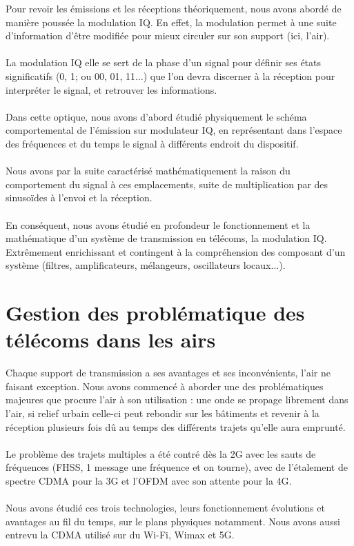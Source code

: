 Pour revoir les émissions et les réceptions théoriquement, nous avons abordé de manière poussée la modulation IQ. En effet, la modulation permet à une suite d'information d'être modifiée pour mieux circuler sur son support (ici, l'air).
\\ \\
La modulation IQ elle se sert de la phase d'un signal pour définir ses états significatifs (0, 1; ou 00, 01, 11...) que l'on devra discerner à la réception pour interpréter le signal, et retrouver les informations.
\\ \\
Dans cette optique, nous avons d'abord étudié physiquement le schéma comportemental de l'émission sur modulateur IQ, en représentant dans l'espace des fréquences et du temps le signal à différents endroit du dispositif.
\\ \\
Nous avons par la suite caractérisé mathématiquement la raison du comportement du signal à ces emplacements, suite de multiplication par des sinusoïdes à l'envoi et la réception.
\\ \\
En conséquent, nous avons étudié en profondeur le fonctionnement et la mathématique d'un système de transmission en télécoms, la modulation IQ. Extrêmement enrichissant et contingent à la compréhension des composant d'un système (filtres, amplificateurs, mélangeurs, oscillateurs locaux...).

\section{Gestion des problématique des télécoms dans les airs}

Chaque support de transmission a ses avantages et ses inconvénients, l'air ne faisant exception. Nous avons commencé à aborder une des problématiques majeures que procure l'air à son utilisation : une onde se propage librement dans l'air, si relief urbain celle-ci peut rebondir sur les bâtiments et revenir à la réception plusieurs fois dû au temps des différents trajets qu'elle aura emprunté.
\\ \\
Le problème des trajets multiples a été contré dès la 2G avec les sauts de fréquences (FHSS, 1 message une fréquence et on tourne), avec de l'étalement de spectre CDMA pour la 3G et l'OFDM avec son attente pour la 4G.
\\ \\
Nous avons étudié ces trois technologies, leurs fonctionnement évolutions et avantages au fil du temps, sur le plans physiques notamment. Nous avons aussi entrevu la CDMA utilisé sur du Wi-Fi, Wimax et 5G.


